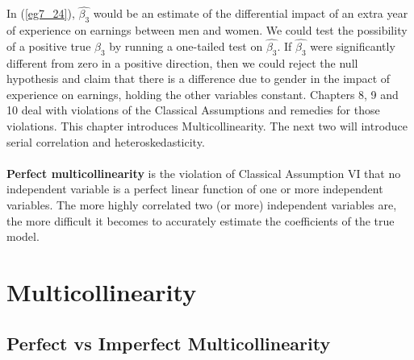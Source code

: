 \documentclass[11pt]{article}
\begin{document}
In (\ref{eg7_24}), $\hat{\beta_3}$ would be an estimate of the differential impact of an extra year of experience on earnings between men and women. We could test the possibility of a positive true $\beta_3$ by running a one-tailed test on $\hat{\beta_3}$. If $\hat{\beta_3}$ were significantly different from zero in a positive direction, then we could reject the null hypothesis and claim that there is a difference due to gender in the impact of experience on earnings, holding the other variables constant.
Chapters 8, 9 and 10 deal with violations of the Classical Assumptions and remedies for those violations. This chapter introduces Multicollinearity. The next two will introduce serial correlation and heteroskedasticity. \\ \\
\textbf{Perfect multicollinearity} is the violation of Classical Assumption VI that no independent variable is a perfect linear function of one or more independent variables. The more highly correlated two (or more) independent variables are, the more difficult it becomes to accurately estimate the coefficients of the true model. 
\clearpage
\section{Multicollinearity}
\subsection{Perfect vs Imperfect Multicollinearity}
\end{document}

